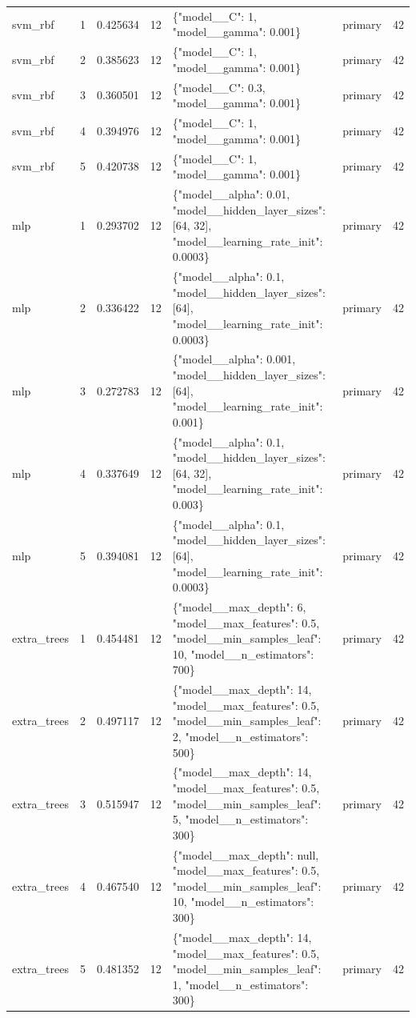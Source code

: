 \begin{tabular}{lrrrllr}
svm\_rbf & 1 & 0.425634 & 12 & \{"model\_\_C": 1, "model\_\_gamma": 0.001\} & primary & 42 \\
svm\_rbf & 2 & 0.385623 & 12 & \{"model\_\_C": 1, "model\_\_gamma": 0.001\} & primary & 42 \\
svm\_rbf & 3 & 0.360501 & 12 & \{"model\_\_C": 0.3, "model\_\_gamma": 0.001\} & primary & 42 \\
svm\_rbf & 4 & 0.394976 & 12 & \{"model\_\_C": 1, "model\_\_gamma": 0.001\} & primary & 42 \\
svm\_rbf & 5 & 0.420738 & 12 & \{"model\_\_C": 1, "model\_\_gamma": 0.001\} & primary & 42 \\
mlp & 1 & 0.293702 & 12 & \{"model\_\_alpha": 0.01, "model\_\_hidden\_layer\_sizes": [64, 32], "model\_\_learning\_rate\_init": 0.0003\} & primary & 42 \\
mlp & 2 & 0.336422 & 12 & \{"model\_\_alpha": 0.1, "model\_\_hidden\_layer\_sizes": [64], "model\_\_learning\_rate\_init": 0.0003\} & primary & 42 \\
mlp & 3 & 0.272783 & 12 & \{"model\_\_alpha": 0.001, "model\_\_hidden\_layer\_sizes": [64], "model\_\_learning\_rate\_init": 0.001\} & primary & 42 \\
mlp & 4 & 0.337649 & 12 & \{"model\_\_alpha": 0.1, "model\_\_hidden\_layer\_sizes": [64, 32], "model\_\_learning\_rate\_init": 0.003\} & primary & 42 \\
mlp & 5 & 0.394081 & 12 & \{"model\_\_alpha": 0.1, "model\_\_hidden\_layer\_sizes": [64], "model\_\_learning\_rate\_init": 0.0003\} & primary & 42 \\
extra\_trees & 1 & 0.454481 & 12 & \{"model\_\_max\_depth": 6, "model\_\_max\_features": 0.5, "model\_\_min\_samples\_leaf": 10, "model\_\_n\_estimators": 700\} & primary & 42 \\
extra\_trees & 2 & 0.497117 & 12 & \{"model\_\_max\_depth": 14, "model\_\_max\_features": 0.5, "model\_\_min\_samples\_leaf": 2, "model\_\_n\_estimators": 500\} & primary & 42 \\
extra\_trees & 3 & 0.515947 & 12 & \{"model\_\_max\_depth": 14, "model\_\_max\_features": 0.5, "model\_\_min\_samples\_leaf": 5, "model\_\_n\_estimators": 300\} & primary & 42 \\
extra\_trees & 4 & 0.467540 & 12 & \{"model\_\_max\_depth": null, "model\_\_max\_features": 0.5, "model\_\_min\_samples\_leaf": 10, "model\_\_n\_estimators": 300\} & primary & 42 \\
extra\_trees & 5 & 0.481352 & 12 & \{"model\_\_max\_depth": 14, "model\_\_max\_features": 0.5, "model\_\_min\_samples\_leaf": 1, "model\_\_n\_estimators": 300\} & primary & 42 \\

\end{tabular}
